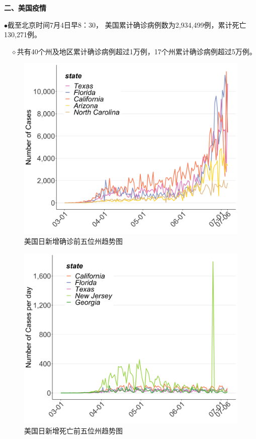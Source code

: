 \documentclass[]{article}
\begin{document}
\vspace{-7mm}

\begin{huge}{\textcolor{glaucous}{\textbf {二、美国疫情}}}\end{huge}

\vspace{-5mm}

\(\bullet\)截至北京时间7月4日早8：30，
美国累计确诊病例数为2,934,499例，累计死亡130,271例。

\(\quad\)\(\diamond\)共有40个州及地区累计确诊病例超过1万例，17个州累计确诊病例超过5万例。

\vspace{2mm}

\begin{figure}[H]
\centering

\caption{美国日新增确诊前五位州趋势图}
\includegraphics[]{./input/covid5.png}
\end{figure}

\begin{figure}[H]
\centering

\caption{美国日新增死亡前五位州趋势图}
\includegraphics[]{./input/covid6.png}
\end{figure}
\end{document}
